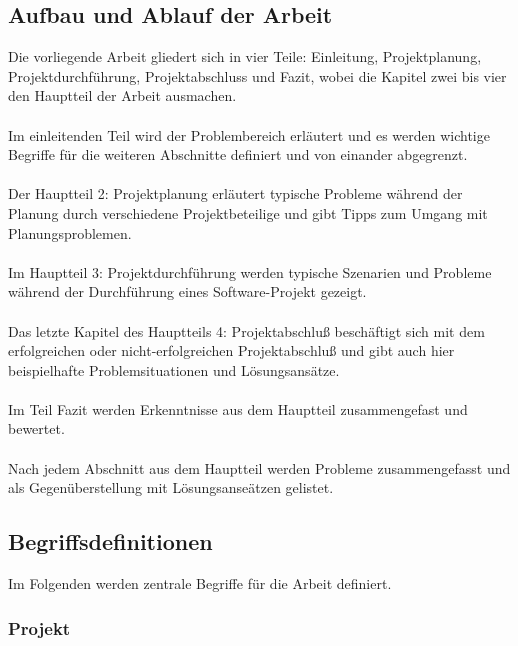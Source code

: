 \documentclass[12pt]{scrartcl}
\begin{document}
\subsection{Aufbau und Ablauf der Arbeit}
Die vorliegende Arbeit gliedert sich in vier Teile: Einleitung, Projektplanung, Projektdurchführung, Projektabschluss und Fazit, wobei die Kapitel zwei bis vier den Hauptteil der Arbeit ausmachen. 
\\ \\
Im einleitenden Teil wird der Problembereich erläutert und es werden wichtige Begriffe für die weiteren Abschnitte definiert und von einander abgegrenzt. 
\\ \\
Der Hauptteil 2: Projektplanung erläutert typische Probleme während der Planung durch verschiedene Projektbeteilige und gibt Tipps zum Umgang mit Planungsproblemen. 
\\ \\
Im Hauptteil 3: Projektdurchführung werden typische Szenarien und Probleme während der Durchführung eines Software-Projekt gezeigt. 
\\ \\
Das letzte Kapitel des Hauptteils 4: Projektabschluß beschäftigt sich mit dem erfolgreichen oder nicht-erfolgreichen Projektabschluß und gibt auch hier beispielhafte Problemsituationen und Lösungsansätze. 
\\ \\
Im Teil Fazit werden Erkenntnisse aus dem Hauptteil zusammengefast und bewertet.
\\ \\
Nach jedem Abschnitt aus dem Hauptteil werden Probleme zusammengefasst und als Gegenüberstellung mit Lösungsanseätzen gelistet. 
\subsection{Begriffsdefinitionen}

Im Folgenden werden zentrale Begriffe für die Arbeit definiert. 

\subsubsection{Projekt}
\end{document}
